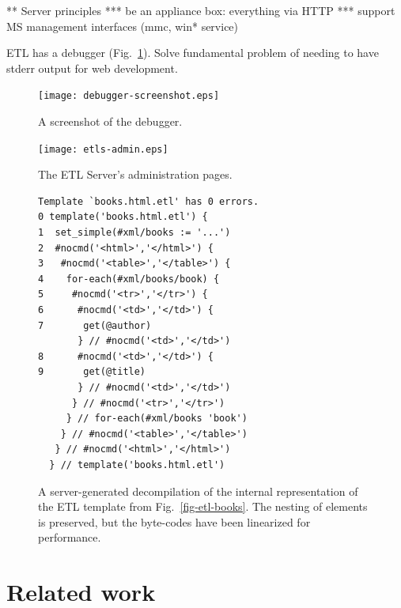 \documentclass{www2003-submission}
\newcommand{\figref}[1]{Fig.~\ref{fig-#1}}
\begin{document}
** Server principles
*** be an appliance box: everything via HTTP
*** support MS management interfaces (mmc, win* service)

ETL has a debugger (\figref{debugger-screenshot}).  Solve fundamental
problem of needing to have stderr output for web development.


\begin{figure}[tb]
\begin{centering}
\hspace*{-0.07\linewidth}\texttt{[image: debugger-screenshot.eps]}
\caption{A screenshot of the debugger.
\label{fig-debugger-screenshot}}
\end{centering}
\end{figure}


\begin{figure}[tb]
\begin{centering}
\hspace*{-0.05\linewidth}\texttt{[image: etls-admin.eps]}
\caption{The ETL Server's administration pages.
\label{fig-etls-admin}}
\end{centering}
\end{figure}



\begin{figure}[htbp]
\begin{verbatim}
Template `books.html.etl' has 0 errors.
0 template('books.html.etl') {
1  set_simple(#xml/books := '...')
2  #nocmd('<html>','</html>') {
3   #nocmd('<table>','</table>') {
4    for-each(#xml/books/book) {
5     #nocmd('<tr>','</tr>') {
6      #nocmd('<td>','</td>') {
7       get(@author)
       } // #nocmd('<td>','</td>')
8      #nocmd('<td>','</td>') {
9       get(@title)
       } // #nocmd('<td>','</td>')
      } // #nocmd('<tr>','</tr>')
     } // for-each(#xml/books 'book')
    } // #nocmd('<table>','</table>')
   } // #nocmd('<html>','</html>')
  } // template('books.html.etl')
\end{verbatim}
\caption{A server-generated decompilation of the internal representation
of the ETL template from \figref{etl-books}.  The nesting of elements
is preserved, but the byte-codes have been linearized for performance.
\label{fig-etl-decompile}}
\end{figure}


\section{Related work}
\end{document}

